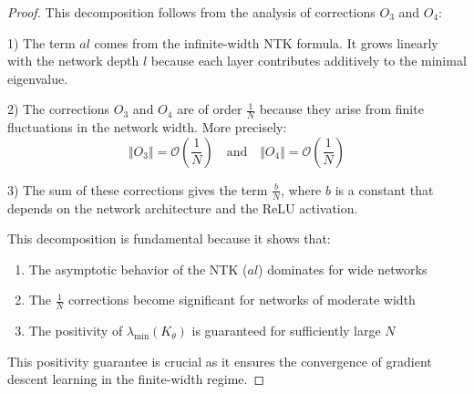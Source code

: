 \documentclass{article}
\newtheorem{proof}{Proof}
\begin{document}
\begin{proof}
This decomposition follows from the analysis of corrections $O_3$ and $O_4$:

1) The term $al$ comes from the infinite-width NTK formula. It grows linearly with the network depth $l$ because each layer contributes additively to the minimal eigenvalue.

2) The corrections $O_3$ and $O_4$ are of order $\frac{1}{N}$ because they arise from finite fluctuations in the network width. More precisely:
   \[ \Vert O_3 \Vert = \mathcal{O}(\frac{1}{N}) \quad \text{and} \quad \Vert O_4 \Vert = \mathcal{O}(\frac{1}{N}) \]

3) The sum of these corrections gives the term $\frac{b}{N}$, where $b$ is a constant that depends on the network architecture and the ReLU activation.

This decomposition is fundamental because it shows that:
\begin{enumerate}
\item The asymptotic behavior of the NTK ($al$) dominates for wide networks
\item The $\frac{1}{N}$ corrections become significant for networks of moderate width
\item The positivity of $\lambda_{\min}(K_\theta)$ is guaranteed for sufficiently large $N$
\end{enumerate}

This positivity guarantee is crucial as it ensures the convergence of gradient descent learning in the finite-width regime.
\end{proof}
\end{document}
